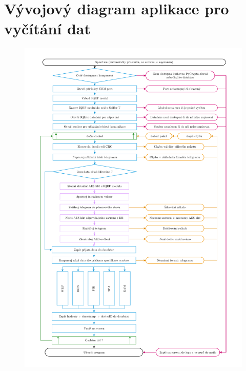 \chapter{Vývojový diagram aplikace pro vyčítání dat}
\label{AplikaceDiagram}
\vspace{-20pt}
 \begin{figure}[!ht]
  \begin{center}
    \includegraphics[scale=0.55]{obrazky/aplikace_diagram}
  \end{center}
\end{figure}

